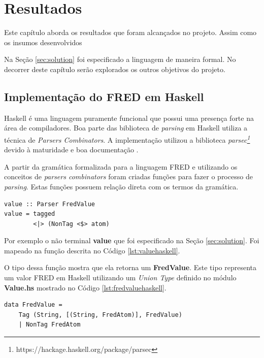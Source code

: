 \chapter[Resultados]{Resultados}

Este capítulo aborda os resultados que foram alcançados no projeto.
Assim como os insumos desenvolvidos

Na Seção \ref{sec:solution} foi especificado a linguagem de maneira formal.
No decorrer deste capítulo serão explorados os outros objetivos do projeto.

\section{Implementação do FRED em Haskell}

Haskell é uma linguagem puramente funcional que possui uma presença
forte na área de compiladores. Boa parte das biblioteca 
de \textit{parsing} em Haskell utiliza a técnica de \textit{Parsers Combinators}.
A implementação utilizou a biblioteca 
\textit{parsec\footnote{https://hackage.haskell.org/package/parsec}}
devido à maturidade e boa documentação \cite{leijen2001parsec}.

A partir da gramática formalizada para a linguagem FRED e utilizando os
conceitos de \textit{parsers combinators} foram criadas funções para
fazer o processo de \textit{parsing}. Estas funções possuem relação
direta com os termos da gramática.

\begin{lstlisting}[caption=Parser para o não terminal value,label={lst:valuehaskell}]
value :: Parser FredValue
value = tagged 
        <|> (NonTag <$> atom)
\end{lstlisting}

Por exemplo o não terminal \textbf{value} que foi especificado 
na Seção \ref{sec:solution}. Foi mapeado na função descrita no 
Código \ref{lst:valuehaskell}. 

O tipo dessa função mostra que ela retorna um \textbf{FredValue}. 
Este tipo representa um valor FRED em Haskell utilizando um 
\textit{Union Type} definido no módulo \textbf{Value.hs} 
mostrado no Código \ref{lst:fredvaluehaskell}.

\begin{lstlisting}[caption=Definição do tipo FredValue,label={lst:fredvaluehaskell}]
data FredValue =
    Tag (String, [(String, FredAtom)], FredValue)
    | NonTag FredAtom
\end{lstlisting}

